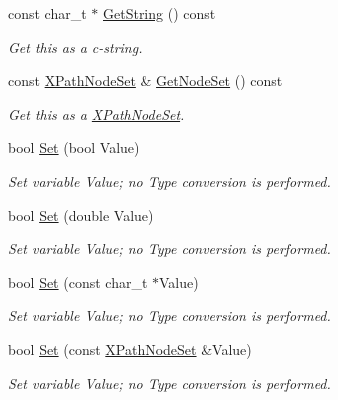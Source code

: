 \begin{DoxyCompactItemize}
const char\_\-t $\ast$ \hyperlink{classphys_1_1xml_1_1XPathVariable_a5354bcb8e5c2ffa6ececcf259049338b}{GetString} () const 
\begin{DoxyCompactList}\small\item\em Get this as a c-\/string. \item\end{DoxyCompactList}\item 
const \hyperlink{classphys_1_1xml_1_1XPathNodeSet}{XPathNodeSet} \& \hyperlink{classphys_1_1xml_1_1XPathVariable_a773036e3c3c3db0af26fa662782f7e56}{GetNodeSet} () const 
\begin{DoxyCompactList}\small\item\em Get this as a \hyperlink{classphys_1_1xml_1_1XPathNodeSet}{XPathNodeSet}. \item\end{DoxyCompactList}\item 
bool \hyperlink{classphys_1_1xml_1_1XPathVariable_aea78a6ac9a12a1be68db8a56fbffebc3}{Set} (bool Value)
\begin{DoxyCompactList}\small\item\em Set variable Value; no Type conversion is performed. \item\end{DoxyCompactList}\item 
bool \hyperlink{classphys_1_1xml_1_1XPathVariable_abb5f6da9b731d770e1a34ee9981b22be}{Set} (double Value)
\begin{DoxyCompactList}\small\item\em Set variable Value; no Type conversion is performed. \item\end{DoxyCompactList}\item 
bool \hyperlink{classphys_1_1xml_1_1XPathVariable_acf825ac8cd7dd20fc6f1c9fd7bb997fe}{Set} (const char\_\-t $\ast$Value)
\begin{DoxyCompactList}\small\item\em Set variable Value; no Type conversion is performed. \item\end{DoxyCompactList}\item 
bool \hyperlink{classphys_1_1xml_1_1XPathVariable_a121079abb73e70ade34f4e69181e5694}{Set} (const \hyperlink{classphys_1_1xml_1_1XPathNodeSet}{XPathNodeSet} \&Value)
\begin{DoxyCompactList}\small\item\em Set variable Value; no Type conversion is performed. \item\end{DoxyCompactList}\end{DoxyCompactItemize}
